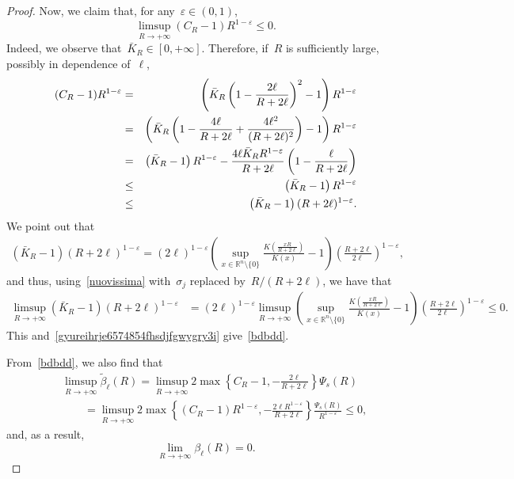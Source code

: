 \documentclass[10pt,a4paper]{amsart}
\numberwithin{equation}{section}
\newcommand{\R}{\mathbb{R}}
\renewcommand{\epsilon}{\varepsilon}
\begin{document}
\begin{proof}
Now, we claim that, for any~$\epsilon \in (0,1)$,
\begin{equation}\label{bdbdd}
\limsup_{R\to +\infty} (C_R -1) R^{1-\epsilon} \leq 0.
\end{equation}
Indeed, we observe that~$\bar{K}_R \in [0,+\infty]$. Therefore, if~$R$ is sufficiently large, possibly in dependence of~$\ell$,
\begin{eqnarray}\label{gyureihrje6574854fhsdjfgwygry3i}
(C_R -1) R^{1-\epsilon} & = & \left(\bar{K}_R\left(1-\frac{2\ell}{R+2\ell} \right)^2 -1\right) R^{1-\epsilon} \notag\\
& = & \left(  \bar{K}_R \left( 1-\frac{4\ell}{R+2\ell}+\frac{4\ell^2}{(R+2\ell)^{2}}\right) -1 \right) R^{1-\epsilon} \notag\\
& = & \left( \bar{K}_R -1 \right) R^{1-\epsilon} - \frac{4\ell \bar{K}_R R^{1-\epsilon}}{R+2\ell}
\left( 1 -\frac{\ell}{R+2\ell}\right)\notag\\
& \leq &  \left( \bar{K}_R -1 \right) R^{1-\epsilon}\notag\\
& \le & \left( \bar{K}_R -1 \right) (R+2\ell)^{1-\epsilon} .
\end{eqnarray}
We point out that
\begin{eqnarray*}
\left( \bar{K}_R -1 \right)(R+2\ell)^{1-\epsilon}=(2\ell)^{1-\epsilon}
\left( \sup_{x \in \R^n \setminus\{0\}} \frac{K(\frac{xR}{R+2\ell})}{K(x)}-1\right)
\left(\frac{R+2\ell}{2\ell}\right)^{1-\epsilon},
\end{eqnarray*}
and thus, using~\eqref{nuovissima} with~$\sigma_j$ replaced by~$R/(R+2\ell)$, we have that
\begin{equation*}
\begin{split}
\limsup_{R\to +\infty} \left( \bar{K}_R -1 \right)(R+2\ell)^{1-\epsilon}
&=(2\ell)^{1-\epsilon}\limsup_{R\to +\infty}
\left( \sup_{x \in  \R^n \setminus\{0\}} \frac{K(\frac{xR}{R+2\ell})}{K(x)}-1\right)
\left(\frac{R+2\ell}{2\ell}\right)^{1-\epsilon}\le 0
.
\end{split}
\end{equation*}
This and~\eqref{gyureihrje6574854fhsdjfgwygry3i} give~\eqref{bdbdd}.

{F}rom~\eqref{bdbdd}, we also find that
\begin{eqnarray*}&&
\limsup_{R\to +\infty}\widetilde{\beta}_{\ell}(R)
=\limsup_{R\to +\infty} 2\max\left\{C_R-1, -\frac{2\ell}{R+2\ell}\right\}\Psi_s(R)\\&&\qquad= \limsup_{R\to +\infty}2
\max\left\{(C_R-1)R^{1-\epsilon}, -\frac{2\ell R^{1-\epsilon}}{R+2\ell}\right\} \frac{\varPsi_s(R)}{R^{1-\epsilon}}\le 0,
\end{eqnarray*} and, as a result,
\begin{equation}\label{ovvr}
\lim_{R \to +\infty}\beta_{\ell}(R) = 0.
\end{equation}


\end{proof}
\end{document}
